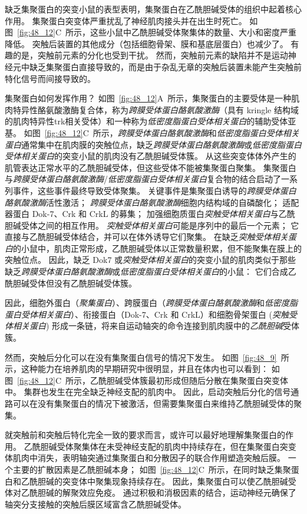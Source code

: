 缺乏集聚蛋白的突变小鼠的表型表明，集聚蛋白在乙酰胆碱受体的组织中起着核心作用。
集聚蛋白突变体严重扰乱了神经肌肉接头并在出生时死亡。
如图~\ref{fig:48_12}C~所示，这些小鼠中乙酰胆碱受体聚集体的数量、大小和密度严重降低。
突触后装置的其他成分（包括细胞骨架、膜和基底层蛋白）也减少了。
有趣的是，突触前元素的分化也受到干扰。
然而，突触前元素的缺陷并不是运动神经元中缺乏集聚蛋白直接导致的，而是由于杂乱无章的突触后装置未能产生突触前特化信号而间接导致的。


集聚蛋白如何发挥作用？
如图~\ref{fig:48_12}A~所示，集聚蛋白的主要受体是一种肌肉特异性酪氨酸激酶复合体，称为\textit{跨膜受体蛋白酪氨酸激酶}（具有 kringle 结构域的肌肉特异性trk相关受体）和一种称为\textit{低密度脂蛋白受体相关蛋白}的辅助受体亚基。
如图~\ref{fig:48_12}C~所示，\textit{跨膜受体蛋白酪氨酸激酶}和\textit{低密度脂蛋白受体相关蛋白}通常集中在肌肉膜的突触位点，缺乏\textit{跨膜受体蛋白酪氨酸激酶}或\textit{低密度脂蛋白受体相关蛋白}的突变小鼠的肌肉没有乙酰胆碱受体簇。
从这些突变体体外产生的肌管表达正常水平的乙酰胆碱受体，但这些受体不能被集聚蛋白聚集。
集聚蛋白与\textit{跨膜受体蛋白酪氨酸激酶}/\textit{低密度脂蛋白受体相关蛋白}复合物的结合启动了一系列事件，这些事件最终导致受体聚集。
关键事件是集聚蛋白诱导的\textit{跨膜受体蛋白酪氨酸激酶}活性激活；
\textit{跨膜受体蛋白酪氨酸激酶}细胞内结构域的自磷酸化；
适配器蛋白 Dok-7、Crk 和 CrkL 的募集；
加强细胞质蛋白\textit{突触受体相关蛋白}与乙酰胆碱受体之间的相互作用。
\textit{突触受体相关蛋白}可能是序列中的最后一个元素；
它直接与乙酰胆碱受体结合，并可以在体外诱导它们聚集。
在缺乏\textit{突触受体相关蛋白}的小鼠中，肌肉正常形成，乙酰胆碱受体以正常数量积累，但不能聚集在膜上的突触位点。
因此，缺乏 Dok7 或\textit{突触受体相关蛋白}的突变小鼠的肌肉类似于那些缺乏\textit{跨膜受体蛋白酪氨酸激酶}或\textit{低密度脂蛋白受体相关蛋白}的小鼠：
它们合成乙酰胆碱受体但没有乙酰胆碱受体簇。


因此，细胞外蛋白（\textit{聚集蛋白}）、跨膜蛋白（\textit{跨膜受体蛋白酪氨酸激酶}和\textit{低密度脂蛋白受体相关蛋白}）、衔接蛋白（Dok-7、Crk 和 CrkL）和细胞骨架蛋白 (\textit{突触受体相关蛋白}) 形成一条链，将来自运动轴突的命令连接到肌肉膜中的\textit{乙酰胆碱}受体簇。


然而，突触后分化可以在没有集聚蛋白信号的情况下发生。
如图~\ref{fig:48_9}~所示，这种能力在培养肌肉的早期研究中很明显，并且在体内也可以看到：
如图~\ref{fig:48_12}C~所示，乙酰胆碱受体簇最初形成但随后分散在集聚蛋白突变体中。
集群也发生在完全缺乏神经支配的肌肉中。
因此，启动突触后分化的信号通路可以在没有集聚蛋白的情况下被激活，但需要集聚蛋白来维持乙酰胆碱受体的聚集。


就突触前和突触后特化完全一致的要求而言，或许可以最好地理解集聚蛋白的作用。
乙酰胆碱受体聚集体在未受神经支配的肌肉中持续存在，但在集聚蛋白突变体肌肉中消失，表明轴突通过集聚蛋白和分散因子的联合作用塑造突触后膜。
一个主要的扩散因素是乙酰胆碱本身；
如图~\ref{fig:48_12}C~所示，在同时缺乏集聚蛋白和乙酰胆碱的突变体中聚集现象持续存在。
因此，集聚蛋白可以使乙酰胆碱受体对乙酰胆碱的解聚效应免疫。
通过积极和消极因素的结合，运动神经元确保了轴突分支接触的突触后膜区域富含乙酰胆碱受体。



